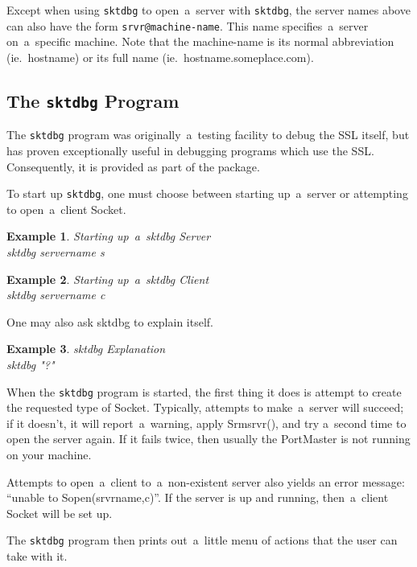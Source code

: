 \documentclass[12pt]{article}
\def\SSL{{\small SSL}}
\newtheorem{example}{Example}[section]
\begin{document}
Except when using \verb`sktdbg` to open~a~server with \verb`sktdbg`, the server
names above can also have the form \verb`srvr@machine-name`.  This name
specifies~a~server on~a~specific machine.  Note that the machine-name is its
normal abbreviation (ie.~hostname) or its full name (ie.~hostname.someplace.com).


\subsection{The \texttt{sktdbg} Program}

The \verb`sktdbg` program was originally~a~testing facility to debug the {\SSL} 
itself, but has proven exceptionally useful in debugging programs which use the
\SSL.  Consequently, it is provided as part of the package.

To start up \verb`sktdbg`, one must choose between starting up~a~server or
attempting to open~a~client Socket.

\begin{example} Starting up~a~sktdbg Server \\ \label{sktdbg-srvr}
sktdbg servername s
\end{example}

\begin{example} Starting up~a~sktdbg Client \\ \label{sktdbg-client}
sktdbg servername c
\end{example}

One may also ask sktdbg to explain itself.

\begin{example} sktdbg Explanation \\ \label{sktdbg-explain}
sktdbg "?"
\end{example}

When the \verb`sktdbg` program is started, the first thing it does is attempt
to create the requested type of Socket.  Typically, attempts to make~a~server
will succeed; if it doesn't, it will report~a~warning, apply Srmsrvr(), and try
a~second time to open the server again.  If it fails twice, then usually the
PortMaster is not running on your machine.

Attempts to open~a~client to~a~non-existent server also yields an error
message: ``unable to Sopen(srvrname,c)''.  If the server is up and running,
then~a~client Socket will be set up.

The \verb`sktdbg` program then prints out~a~little menu of actions that the
user can take with it.
\end{document}
